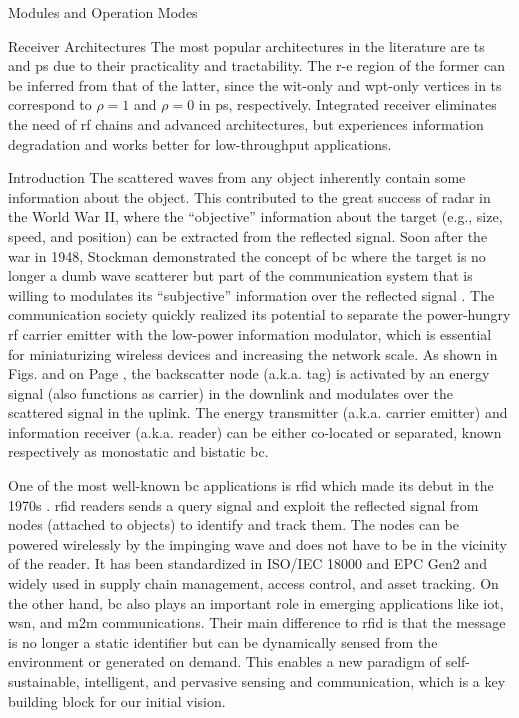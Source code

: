 \begin{section}{}
\begin{subsection}{Modules and Operation Modes}
\begin{subsubsection}{Receiver Architectures}
			The most popular architectures in the literature are \gls{ts} and \gls{ps} due to their practicality and tractability.
			The \gls{r-e} region of the former can be inferred from that of the latter, since the \gls{wit}-only and \gls{wpt}-only vertices in \gls{ts} correspond to $\rho=1$ and $\rho=0$ in \gls{ps}, respectively.
			Integrated receiver eliminates the need of \gls{rf} chains and advanced architectures, but experiences information degradation and works better for low-throughput applications.
		\end{subsubsection}
	\end{subsection}
\end{section}

\begin{section}{}
	\begin{subsection}{Introduction}
		The scattered waves from any object inherently contain some information about the object.
		This contributed to the great success of radar in the World War II, where the ``objective'' information about the target (e.g., size, speed, and position) can be extracted from the reflected signal.
		Soon after the war in 1948, Stockman demonstrated the concept of \gls{bc} where the target is no longer a dumb wave scatterer but part of the communication system that is willing to modulates its ``subjective'' information over the reflected signal \cite{Stockman1948}.
		The communication society quickly realized its potential to separate the power-hungry \gls{rf} carrier emitter with the low-power information modulator, which is essential for miniaturizing wireless devices and increasing the network scale.
		As shown in Figs.  and  on Page \pageref{fg:wipt_schemes}, the backscatter node (a.k.a. tag) is activated by an energy signal (also functions as carrier) in the downlink and modulates over the scattered signal in the uplink. The energy transmitter (a.k.a. carrier emitter) and information receiver (a.k.a. reader) can be either co-located or separated, known respectively as monostatic and bistatic \gls{bc}.

		One of the most well-known \gls{bc} applications is \gls{rfid} which made its debut in the 1970s \cite{Landt2005}.
		\gls{rfid} readers sends a query signal and exploit the reflected signal from nodes (attached to objects) to identify and track them.
		The nodes can be powered wirelessly by the impinging wave and does not have to be in the vicinity of the reader.
		It has been standardized in ISO/IEC 18000 and EPC Gen2 \cite{Abbasi2021a} and widely used in supply chain management, access control, and asset tracking.
		On the other hand, \gls{bc} also plays an important role in emerging applications like \gls{iot}, \gls{wsn}, and \gls{m2m} communications.
		Their main difference to \gls{rfid} is that the message is no longer a static identifier but can be dynamically sensed from the environment or generated on demand.
		This enables a new paradigm of self-sustainable, intelligent, and pervasive sensing and communication, which is a key building block for our initial vision.


\end{subsection}
\end{section}
